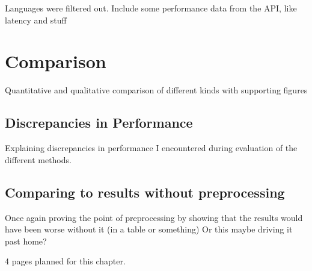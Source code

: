 Languages were filtered out.
Include some performance data from the API, like latency and stuff

\section{Comparison}
\label{sec:comparison}

Quantitative and qualitative comparison of different kinds with supporting figures

\subsection{Discrepancies in Performance}
\label{subsec:discrepanciesinperformance}

Explaining discrepancies in performance I encountered during evaluation of the different methods.

\subsection{Comparing to results without preprocessing}
\label{subsec:comparingToResultsWithoutPreprocessing}

Once again proving the point of preprocessing by showing that the results would have been worse without it (in a table or something)
Or this maybe driving it past home?

4 pages planned for this chapter.
\pagebreak[4]

